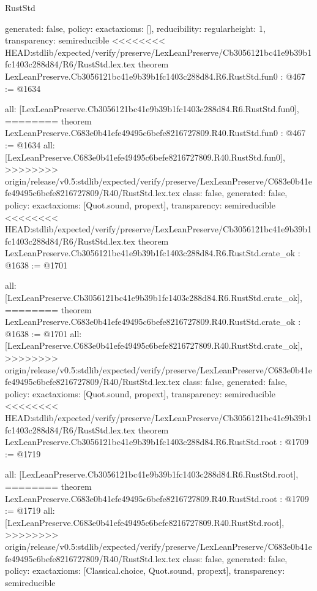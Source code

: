 \begin{lexlean}{RustStd}
\begin{coremodule}
{\begin{coremodule}
{{{  generated: false,
  policy: exact{axioms: []},
  reducibility: regular{height: 1},
  transparency: semireducible
}
<<<<<<<< HEAD:stdlib/expected/verify/preserve/LexLeanPreserve/Cb3056121bc41e9b39b1fc1403c288d84/R6/RustStd.lex.tex
theorem LexLeanPreserve.Cb3056121bc41e9b39b1fc1403c288d84.R6.RustStd.fun0 : @467 := @1634 {
  all: [LexLeanPreserve.Cb3056121bc41e9b39b1fc1403c288d84.R6.RustStd.fun0],
========
theorem LexLeanPreserve.C683e0b41efe49495c6befe8216727809.R40.RustStd.fun0 : @467 := @1634 {
  all: [LexLeanPreserve.C683e0b41efe49495c6befe8216727809.R40.RustStd.fun0],
>>>>>>>> origin/release/v0.5:stdlib/expected/verify/preserve/LexLeanPreserve/C683e0b41efe49495c6befe8216727809/R40/RustStd.lex.tex
  class: false,
  generated: false,
  policy: exact{axioms: [Quot.sound, propext]},
  transparency: semireducible
}
<<<<<<<< HEAD:stdlib/expected/verify/preserve/LexLeanPreserve/Cb3056121bc41e9b39b1fc1403c288d84/R6/RustStd.lex.tex
theorem LexLeanPreserve.Cb3056121bc41e9b39b1fc1403c288d84.R6.RustStd.crate_ok : @1638 := @1701 {
  all: [LexLeanPreserve.Cb3056121bc41e9b39b1fc1403c288d84.R6.RustStd.crate_ok],
========
theorem LexLeanPreserve.C683e0b41efe49495c6befe8216727809.R40.RustStd.crate_ok : @1638 := @1701 {
  all: [LexLeanPreserve.C683e0b41efe49495c6befe8216727809.R40.RustStd.crate_ok],
>>>>>>>> origin/release/v0.5:stdlib/expected/verify/preserve/LexLeanPreserve/C683e0b41efe49495c6befe8216727809/R40/RustStd.lex.tex
  class: false,
  generated: false,
  policy: exact{axioms: [Quot.sound, propext]},
  transparency: semireducible
}
<<<<<<<< HEAD:stdlib/expected/verify/preserve/LexLeanPreserve/Cb3056121bc41e9b39b1fc1403c288d84/R6/RustStd.lex.tex
theorem LexLeanPreserve.Cb3056121bc41e9b39b1fc1403c288d84.R6.RustStd.root : @1709 := @1719 {
  all: [LexLeanPreserve.Cb3056121bc41e9b39b1fc1403c288d84.R6.RustStd.root],
========
theorem LexLeanPreserve.C683e0b41efe49495c6befe8216727809.R40.RustStd.root : @1709 := @1719 {
  all: [LexLeanPreserve.C683e0b41efe49495c6befe8216727809.R40.RustStd.root],
>>>>>>>> origin/release/v0.5:stdlib/expected/verify/preserve/LexLeanPreserve/C683e0b41efe49495c6befe8216727809/R40/RustStd.lex.tex
  class: false,
  generated: false,
  policy: exact{axioms: [Classical.choice, Quot.sound, propext]},
  transparency: semireducible
}

}}}}}
\end{coremodule}}
\end{coremodule}
\end{lexlean}
